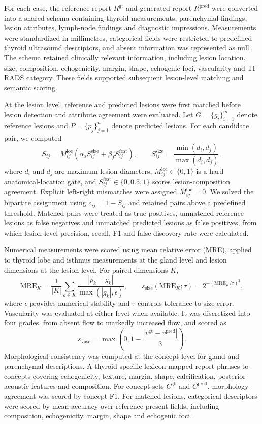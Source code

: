 \documentclass[fleqn,10pt]{wlscirep}
\begin{document}
For each case, the reference report \(R^{\mathrm{gt}}\) and generated report \(R^{\mathrm{pred}}\) were converted into a shared schema containing thyroid measurements, parenchymal findings, lesion attributes, lymph-node findings and diagnostic impressions. Measurements were standardized in millimetres, categorical fields were restricted to predefined thyroid ultrasound descriptors, and absent information was represented as null. The schema retained clinically relevant information, including lesion location, size, composition, echogenicity, margin, shape, echogenic foci, vascularity and TI-RADS category. These fields supported subsequent lesion-level matching and semantic scoring.

At the lesion level, reference and predicted lesions were first matched before lesion detection and attribute agreement were evaluated. Let \(G=\{g_i\}_{i=1}^{m}\) denote reference lesions and \(P=\{p_j\}_{j=1}^{n}\) denote predicted lesions. For each candidate pair, we computed
\[
S_{ij}=M^{\mathrm{loc}}_{ij}
\left(\alpha_sS^{\mathrm{size}}_{ij}+\beta_fS^{\mathrm{feat}}_{ij}\right),
\qquad
S^{\mathrm{size}}_{ij}=\frac{\min(d_i,d_j)}{\max(d_i,d_j)},
\]
where \(d_i\) and \(d_j\) are maximum lesion diameters, \(M^{\mathrm{loc}}_{ij}\in\{0,1\}\) is a hard anatomical-location gate, and \(S^{\mathrm{feat}}_{ij}\in\{0,0.5,1\}\) scores lesion-composition agreement. Explicit left-right mismatches were assigned \(M^{\mathrm{loc}}_{ij}=0\). We solved the bipartite assignment using \(c_{ij}=1-S_{ij}\) and retained pairs above a predefined threshold. Matched pairs were treated as true positives, unmatched reference lesions as false negatives and unmatched predicted lesions as false positives, from which lesion-level precision, recall, F1 and false discovery rate were calculated.

Numerical measurements were scored using mean relative error (MRE), applied to thyroid lobe and isthmus measurements at the gland level and lesion dimensions at the lesion level. For paired dimensions \(K\),
\[
\mathrm{MRE}_{K}=\frac{1}{|K|}\sum_{k\in K}
\frac{|p_k-g_k|}{\max(|g_k|,\epsilon)},\qquad
s_{\mathrm{size}}(\mathrm{MRE}_{K};\tau)=2^{-(\mathrm{MRE}_{K}/\tau)^2},
\]
where \(\epsilon\) provides numerical stability and \(\tau\) controls tolerance to size error. Vascularity was evaluated at either level when available. It was discretized into four grades, from absent flow to markedly increased flow, and scored as
\[
s_{\mathrm{vasc}}=\max\left(0,1-\frac{|v^{\mathrm{gt}}-v^{\mathrm{pred}}|}{3}\right).
\]
Morphological consistency was computed at the concept level for gland and parenchymal descriptions. A thyroid-specific lexicon mapped report phrases to concepts covering echogenicity, texture, margin, shape, calcification, posterior acoustic features and composition. For concept sets \(C^{\mathrm{gt}}\) and \(C^{\mathrm{pred}}\), morphology agreement was scored by concept F1. For matched lesions, categorical descriptors were scored by mean accuracy over reference-present fields, including composition, echogenicity, margin, shape and echogenic foci.
\end{document}
